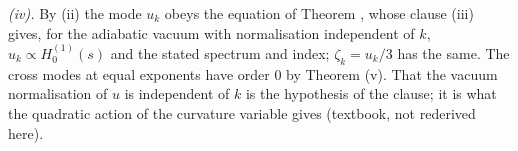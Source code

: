 \emph{(iv).} By (ii) the mode $u_{k}$ obeys the equation of Theorem , whose clause (iii) gives, for the adiabatic vacuum with normalisation independent of $k$, $u_{k} \propto H^{(1)}_{0}(s)$ and the stated spectrum and index; $\zeta_{k} = u_{k}/3$ has the same. The cross modes at equal exponents have order $0$ by Theorem (v). That the vacuum normalisation of $u$ is independent of $k$ is the hypothesis of the clause; it is what the quadratic action of the curvature variable gives (textbook, not rederived here).

